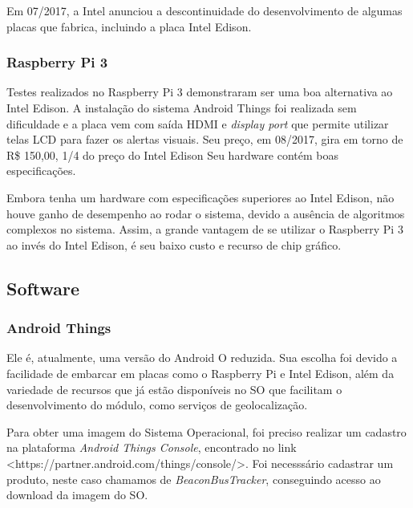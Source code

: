 \documentclass[
	12pt,				%
	oneside,			%
	a4paper,			%
	brazil				%
]{abntex2}
\begin{document}
Em 07/2017, a Intel anunciou a descontinuidade do desenvolvimento de algumas placas que fabrica, incluindo a placa Intel Edison.

\subsubsection{Raspberry Pi 3}

Testes realizados no Raspberry Pi 3 demonstraram ser uma boa alternativa ao Intel Edison. A instalação do sistema Android Things foi realizada sem dificuldade e a placa vem com saída HDMI e \textit{display port} que permite utilizar telas LCD para fazer os alertas visuais.
Seu preço, em 08/2017, gira em torno de R\$ 150,00, 1/4 do preço do Intel Edison Seu hardware contém boas especificações.

Embora tenha um hardware com especificações superiores ao Intel Edison, não houve ganho de desempenho ao rodar o sistema, devido a ausência de algoritmos complexos no sistema. Assim, a grande vantagem de se utilizar o Raspberry Pi 3 ao invés do Intel Edison, é seu baixo custo e recurso de chip gráfico.

\subsection{Software}

\subsubsection{Android Things}

Ele é, atualmente, uma versão do Android O reduzida. Sua escolha foi devido a facilidade de embarcar em placas como o Raspberry Pi e Intel Edison, além da variedade de recursos que já estão disponíveis no SO que facilitam o desenvolvimento do módulo, como serviços de geolocalização. 

Para obter uma imagem do Sistema Operacional, foi preciso realizar um cadastro na plataforma \textit{Android Things Console}, encontrado no link <https://partner.android.com/things/console/>. Foi necesssário cadastrar um produto, neste caso chamamos de \textit{BeaconBusTracker}, conseguindo acesso ao download da imagem do SO.
\end{document}
